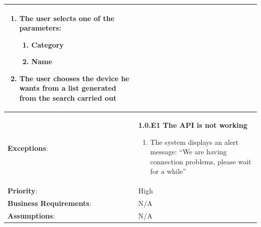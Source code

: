 \begin{table}[H]
\begin{adjustbox}{width=1.2\textwidth,center=\textwidth}
\begin{tabular}{|m{4cm}|m{12cm}|}
\begin{enumerate}
                \item The user selects one of the parameters:
                \begin{enumerate}
                    \item Category
                    \item Name
                \end{enumerate}
                \item The user chooses the device he wants from a list generated from the search carried out
            \end{enumerate} \\
            \hline
            \textbf{Exceptions}: & \textbf{1.0.E1  The API is not working}
            \begin{enumerate}
                \item The system displays an alert message: ``We are having connection problems, please wait for a while''
            \end{enumerate} \\
            \hline
            \textbf{Priority}: & High \\
            \hline
            \textbf{Business Requirements}: & N/A \\
            \hline
            \textbf{Assumptions}: & N/A \\
            \hline
        \end{tabular}
    \end{adjustbox}
\end{table}

